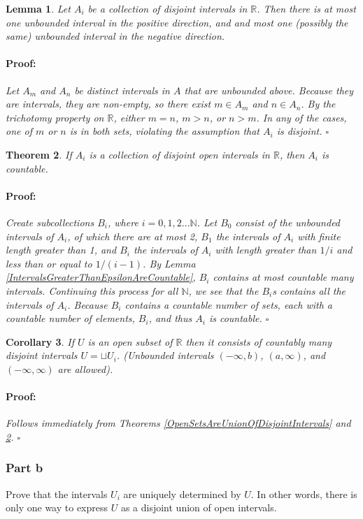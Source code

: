 \documentclass{article}
\newenvironment{proof}{\paragraph{Proof:}}{\hfill$\square$}
\newtheorem{theorem}{Theorem}
\newtheorem{lemma}[theorem]{Lemma}
\newtheorem{corollary}[theorem]{Corollary}
\begin{document}
\begin{lemma}
Let $A_i$ be a collection of disjoint intervals in $\mathbb{R}$. Then there is at most one unbounded interval in the positive direction, and and most one (possibly the same) unbounded interval in the negative direction.
\begin{proof}
Let $A_m$ and $A_n$ be distinct intervals in $A$ that are unbounded above. Because they are intervals, they are non-empty, so there exist $m \in A_m$ and $n \in A_n$. By the trichotomy property on $\mathbb{R}$, either $m = n$, $m > n$, or $n > m$. In any of the cases, one of $m$ or $n$ is in both sets, violating the assumption that $A_i$ is disjoint.
\end{proof}
\end{lemma}

\begin{theorem}
\label{DisjointOpenIntervalsAreCountable}
If $A_i$ is a collection of disjoint open intervals in $\mathbb{R}$, then $A_i$ is countable.
\begin{proof}
Create subcollections $B_i$, where $i = 0, 1, 2 \dots \mathbb{N}$. Let $B_0$ consist of the unbounded intervals of $A_i$, of which there are at most 2, $B_1$ the intervals of $A_i$ with finite length greater than 1, and $B_i$ the intervals of $A_i$ with length greater than $1/ i$ and less than or equal to $1/(i-1)$. By Lemma \ref{IntervalsGreaterThanEpsilonAreCountable}, $B_i$ contains at most countable many intervals. Continuing this process for all $\mathbb{N}$, we see that the $B_i$s contains all the intervals of $A_i$. Because $B_i$ contains a countable number of sets, each with a countable number of elements, $B_i$, and thus $A_i$ is countable.
\end{proof}
\end{theorem}

\begin{corollary}
If $U$ is an open subset of $\mathbb{R}$ then it consists of countably many disjoint intervals $U = \sqcup U_i$. (Unbounded intervals $(-\infty, b)$, $(a, \infty)$, and $(-\infty, \infty)$ are allowed).
\begin{proof}
Follows immediately from Theorems \ref{OpenSetsAreUnionOfDisjointIntervals} and \ref{DisjointOpenIntervalsAreCountable}.
\end{proof}
\end{corollary}

\subsubsection*{Part b}
Prove that the intervals $U_i$ are uniquely determined by $U$. In other words, there is only one way to express $U$ as a disjoint union of open intervals.
\end{document}
